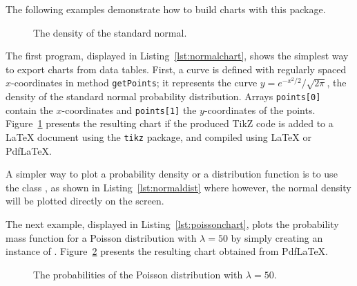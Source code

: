 \begin{latexonly}

The following examples demonstrate how to build charts with this package.



\begin{figure}

\caption{The density of the standard normal.\label{fig:normalchart-res}}
\end{figure}


The first program, displayed in Listing~\ref{lst:normalchart},
shows the simplest way to export charts from data tables.
First, a curve is defined with regularly spaced $x$-coordinates
in method \texttt{getPoints}; it represents the curve
 $y = e^{-x^2/2}/\sqrt{2\pi}$, the density of the standard normal probability
 distribution. Arrays \texttt{points[0]} contain
the $x$-coordinates and \texttt{points[1]} the $y$-coordinates
of the points.
Figure~\ref{fig:normalchart-res} presents the resulting chart if the produced
TikZ code is added to a \LaTeX{} document using the \texttt{tikz}
package, and compiled using \LaTeX{} or Pdf\LaTeX.




A simpler way to plot a
 probability density or a distribution function is to use the class
, as shown
in Listing~\ref{lst:normaldist}  where however, the normal density will be plotted
directly on the screen.






The next example, displayed in Listing~\ref{lst:poissonchart}, plots the
probability mass function for a Poisson distribution with $\lambda= 50$
by simply creating an instance of
.
Figure~\ref{fig:poissonchart-res} presents the resulting chart obtained
from Pdf\LaTeX.

\begin{figure}

\caption{The probabilities of the Poisson distribution with $\lambda= 50$.\label{fig:poissonchart-res}}
\end{figure}



\end{latexonly}
